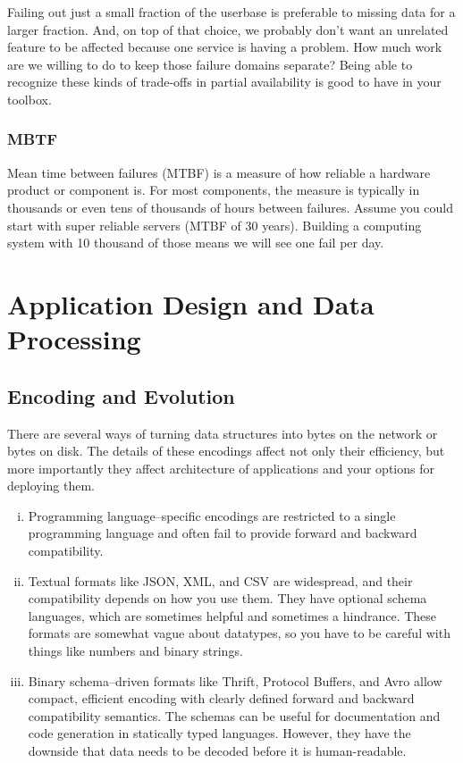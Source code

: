 \documentclass{article}
\begin{document}
    Failing out just a small fraction of the userbase is preferable to missing data for a larger fraction. And, on top of that choice, we probably don’t want an unrelated feature to be affected because one service is having a problem. How much work are we willing to do to keep those failure domains separate? Being able to recognize these kinds of trade-offs in partial availability is good to have in your toolbox.

    \subsubsection{MBTF}
    Mean time between failures (MTBF)  is a measure of how reliable a hardware product or component is. For most components, the measure is typically in thousands or even tens of thousands of hours between failures.
    Assume you could start with super reliable servers (MTBF of 30 years). Building a computing system with 10 thousand of those means we will see one fail per day.

\newpage
\section{Application Design and Data Processing}
    \subsection{Encoding and Evolution}
    There are several ways of turning data structures into bytes on the network or bytes on disk. The details of these encodings affect not only their efficiency, but more importantly they affect architecture of applications and your options for deploying them.
    
    \begin{enumerate}[i.]
        \item Programming language–specific encodings are restricted to a single programming language and often fail to provide forward and backward compatibility.
        \item Textual formats like JSON, XML, and CSV are widespread, and their compatibility depends on how you use them. They have optional schema languages, which are sometimes helpful and sometimes a hindrance. These formats are somewhat vague about datatypes, so you have to be careful with things like numbers and  binary strings.
        \item Binary schema–driven formats like Thrift, Protocol Buffers, and Avro allow compact, efficient encoding with clearly defined forward and backward compatibility semantics. The schemas can be useful for documentation and code generation in statically typed languages. However, they have the downside that data   needs to be decoded before it is human-readable.
    \end{enumerate}
    
\end{document}
